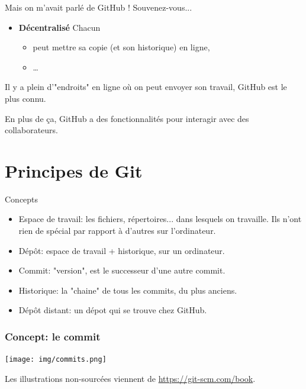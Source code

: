 \documentclass{beamer}
\begin{document}
\begin{frame}{Mais on m'avait parlé de GitHub !}
    Souvenez-vous...
    \begin{itemize}
        \item \textbf{Décentralisé} Chacun
            \begin{itemize}
                \item peut mettre sa copie (et son historique) en ligne,
                \item \dots
            \end{itemize}
    \end{itemize}

    Il y a plein d'"endroits" en ligne o\`u on peut envoyer son travail, GitHub
    est le plus connu.

    En plus de ça, GitHub a des fonctionnalités pour interagir avec des collaborateurs.
\end{frame}

\section{Principes de Git}

\begin{frame}{Concepts}
    \begin{itemize}
        \item Espace de travail: les fichiers, répertoires... dans lesquels on
            travaille. Ils n'ont rien de spécial par rapport à d'autres sur
            l'ordinateur.
        \item Dépôt: espace de travail + historique, sur un ordinateur.
        \item Commit: "version", est le successeur d'une autre commit.
        \item Historique: la "chaine" de tous les commits, du plus anciens.
        \item Dépôt distant: un dépot qui se trouve chez GitHub.
    \end{itemize}
\end{frame}

\begin{frame}
\frametitle{Concept: le \textbf{commit}}

\begin{center}
    \texttt{[image: img/commits.png]}
\end{center}
\footnotesize{Les illustrations non-sourcées viennent de \url{https://git-scm.com/book}.}
\end{frame}
\end{document}
